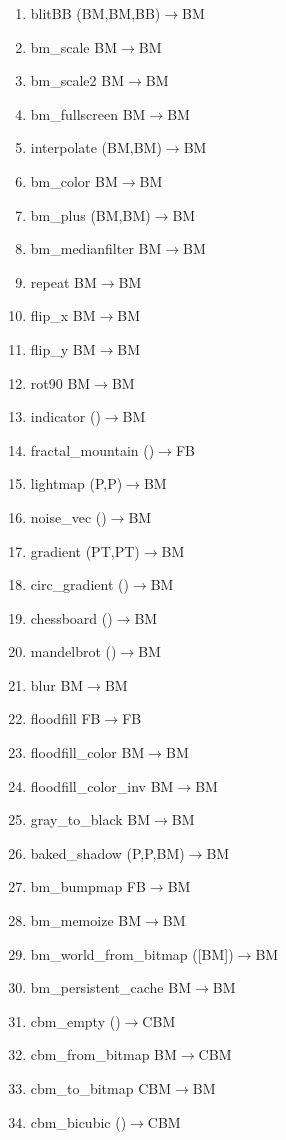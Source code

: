 \documentclass[11pt,twoside,a4paper]{article}
\begin{document}
\begin{itemize}
\begin{enumerate}
\item blitBB (BM,BM,BB)$\rightarrow$BM
\item bm\_scale BM$\rightarrow$BM
\item bm\_scale2 BM$\rightarrow$BM
\item bm\_fullscreen BM$\rightarrow$BM
\item interpolate (BM,BM)$\rightarrow$BM
\item bm\_color BM$\rightarrow$BM
\item bm\_plus (BM,BM)$\rightarrow$BM
\item bm\_medianfilter BM$\rightarrow$BM
\item repeat BM$\rightarrow$BM
\item flip\_x BM$\rightarrow$BM
\item flip\_y BM$\rightarrow$BM
\item rot90 BM$\rightarrow$BM
\item indicator ()$\rightarrow$BM
\item fractal\_mountain ()$\rightarrow$FB
\item lightmap (P,P)$\rightarrow$BM
\item noise\_vec ()$\rightarrow$BM
\item gradient (PT,PT)$\rightarrow$BM
\item circ\_gradient ()$\rightarrow$BM
\item chessboard ()$\rightarrow$BM
\item mandelbrot ()$\rightarrow$BM
\item blur BM$\rightarrow$BM
\item floodfill FB$\rightarrow$FB
\item floodfill\_color BM$\rightarrow$BM
\item floodfill\_color\_inv BM$\rightarrow$BM
\item gray\_to\_black BM$\rightarrow$BM
\item baked\_shadow (P,P,BM)$\rightarrow$BM
\item bm\_bumpmap FB$\rightarrow$BM
\item bm\_memoize BM$\rightarrow$BM
\item bm\_world\_from\_bitmap ([BM])$\rightarrow$BM
\item bm\_persistent\_cache BM$\rightarrow$BM
\item cbm\_empty ()$\rightarrow$CBM
\item cbm\_from\_bitmap BM$\rightarrow$CBM
\item cbm\_to\_bitmap CBM$\rightarrow$BM
\item cbm\_bicubic ()$\rightarrow$CBM

\end{enumerate}
\end{itemize}
\end{document}
